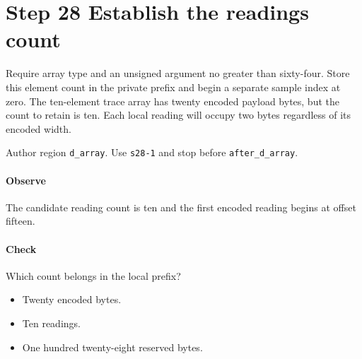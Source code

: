 \section{Step 28 Establish the readings count}\label{cbor-s28}
Require array type and an unsigned argument no greater than sixty-four. Store this element count in the private prefix and begin a separate sample index at zero. The ten-element trace array has twenty encoded payload bytes, but the count to retain is ten. Each local reading will occupy two bytes regardless of its encoded width.

Author region \texttt{d\_array}. Use \texttt{s28-1} and stop before \texttt{after\_d\_array}.

\paragraph{Observe} The candidate reading count is ten and the first encoded reading begins at offset fifteen.

\paragraph{Check} Which count belongs in the local prefix?
\begin{itemize}
  \item[A.] Twenty encoded bytes.
  \item[B.] Ten readings.
  \item[C.] One hundred twenty-eight reserved bytes.
\end{itemize}
